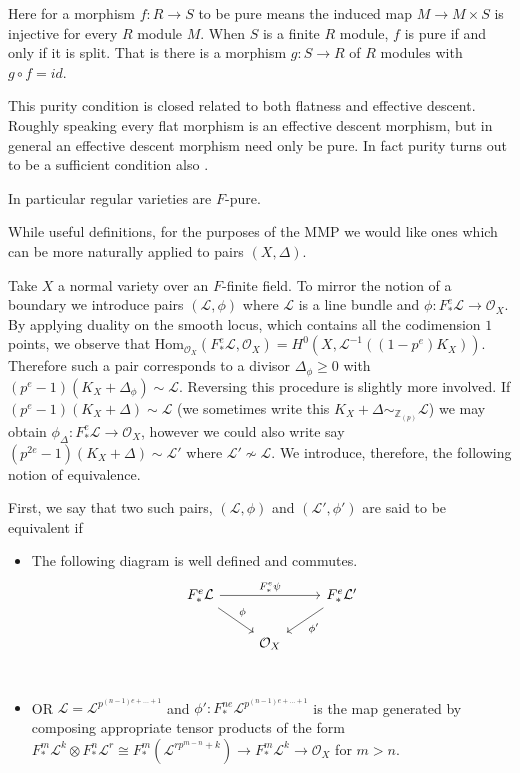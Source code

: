 \documentclass[a4paper,12pt]{book}
\newcommand{\Hom}{\text{Hom}}
\newcommand{\Fe}{F^{e}_{*}}
\newcommand{\ox}{\mathcal{O}_{X}}
\newcommand{\zp}{\mathbb{Z}_{(p)}}
\begin{document}
Here for a morphism $f:R \to S$ to be pure means the induced map $M \to M \times S$ is injective for every $R$ module $M$. When $S$ is a finite $R$ module, $f$ is pure if and only if it is split. That is there is a morphism $g:S \to R$ of $R$ modules with $g \circ f =id$.

\begin{remark}

	This purity condition is closed related to both flatness and effective descent. Roughly speaking every flat morphism is an effective descent morphism, but in general an effective descent morphism need only be pure. In fact purity turns out to be a sufficient condition also \cite[Tag 08WE]{stacks-project}.
	
	In particular regular varieties are $F$-pure.
	
	\end{remark}

While useful definitions, for the purposes of the MMP we would like ones which can be more naturally applied to pairs $(X,\Delta)$.

Take $X$ a normal variety over an $F$-finite field. To mirror the notion of a boundary we introduce pairs $(\mathcal{L}, \phi)$ where $\mathcal{L}$ is a line bundle and $\phi: \Fe \mathcal{L} \to \ox$. By applying duality on the smooth locus, which contains all the codimension $1$ points, we observe that $\Hom_{\ox}(\Fe \mathcal{L},\ox)=H^{0}(X,\mathcal{L}^{-1}((1-p^{e})K_{X}))$. Therefore such a pair corresponds to a divisor $\Delta_{\phi} \geq 0$ with $(p^{e}-1)(K_{X}+\Delta_{\phi}) \sim \mathcal{L}$. Reversing this procedure is slightly more involved. If ${(p^{e}-1)(K_{X}+\Delta) \sim \mathcal{L}}$ (we sometimes write this $K_{X}+\Delta \sim_{\zp} \mathcal{L}$) we may obtain $\phi_{\Delta}:\Fe \mathcal{L} \to \ox$, however we could also write say $(p^{2e}-1)(K_{X}+\Delta) \sim \mathcal{L'}$ where $\mathcal{L'} \not\sim \mathcal{L}$. We introduce, therefore, the following notion of equivalence.

First, we say that two such pairs, $(\mathcal{L}, \phi)$ and $(\mathcal{L}', \phi')$ are said to be equivalent if

\begin{itemize}
	\item The following diagram is well defined and commutes.
	\[\begin{tikzcd}
	\Fe \mathcal{L} \arrow[rd, "\phi"] \arrow[rr, "\Fe \psi"] &     & \Fe \mathcal{L}' \arrow[ld, "\phi'"] \\
	& \ox &                                     
	\end{tikzcd}\]
	\\
	\item OR $\mathcal{L}=\mathcal{L}^{p^{(n-1)e+...+1}}$ and $\phi':F_{*}^{ne}\mathcal{L}^{p^{(n-1)e+...+1}}$ is the map generated by composing appropriate tensor products of the form $F_{*}^{m}\mathcal{L}^{k} \otimes F_{*}^{n} \mathcal{L}^{r}\cong F_{*}^{m}(\mathcal{L}^{rp^{m-n}+k}) \to F^{m}_{*}\mathcal{L}^{k}\to \ox$ for $m>n$.
\end{itemize}
\end{document}
